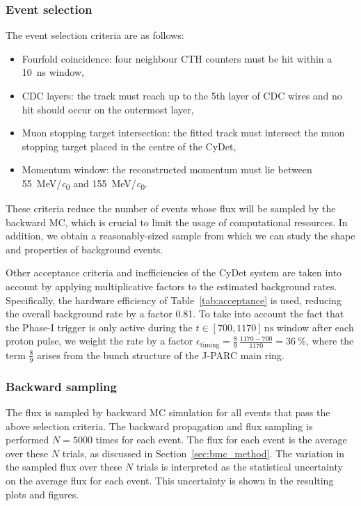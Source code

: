 \subsubsection{Event selection}
The event selection criteria are as follows:
\begin{itemize}
    \item Fourfold coincidence: four neighbour CTH counters must be hit
    within a \SI{10}{\ns} window,
    \item CDC layers: the track must reach up to the 5th layer of CDC
    wires and no hit should occur on the outermost layer,
    \item Muon stopping target intersection: the fitted track must intersect the
    muon stopping target placed in the centre of the CyDet,
    \item Momentum window: the reconstructed momentum must lie between
    \SI{55}{\MeV/\clight} and \SI{155}{\MeV/\clight}.
\end{itemize}
These criteria reduce the number of events whose flux will be sampled by the
backward MC, which is crucial to limit the usage of computational resources. In
addition, we obtain a reasonably-sized sample from which we can study the shape
and properties of background events.

Other acceptance criteria and inefficiencies of the CyDet system are taken into
account by applying multiplicative factors to the estimated background rates.
Specifically, the hardware efficiency of Table~\ref{tab:acceptance} is used,
reducing the overall background rate by a factor 0.81. To take into account the
fact that the Phase\nobreakdash-I trigger is only active during the $t \in [700, 1170]\,
\si{\ns}$ window after each proton pulse, we weight the rate by a factor
$\epsilon_\text{timing} = \frac{8}{9}\,\frac{1170 - 700}{1170} =
\SI{36}{\percent}$, where the term $\frac{8}{9}$ arises from the bunch
structure of the J-PARC main ring.

\subsubsection{Backward sampling}
The flux is sampled by backward MC simulation for all events that pass the above
selection criteria. The backward propagation and flux sampling is performed
$N=5000$ times for each event. The flux for each event is the average over these
$N$ trials, as discussed in Section~\ref{sec:bmc_method}. The variation in the
sampled flux over these $N$ trials is interpreted as the statistical uncertainty
on the average flux for each event. This uncertainty is shown in the resulting
plots and figures.

